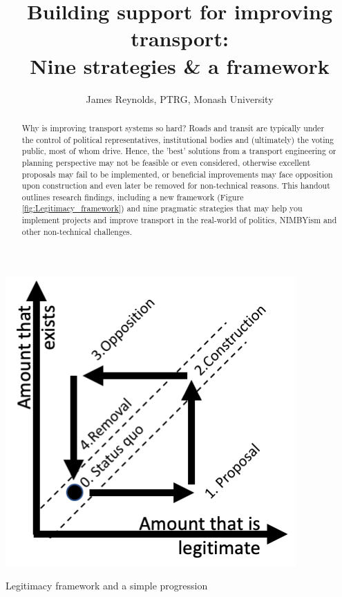 \documentclass{tufte-handout}
\title{Building support for improving transport: \\ Nine strategies \& a framework}
\author{James Reynolds, PTRG, Monash University}
\begin{document}
\maketitle%


\begin{marginfigure}%
  \includegraphics[width=\linewidth]{Framework_and_progression}
  \caption{Legitimacy framework and a simple progression}
  \label{fig:Legitimacy_framework}
\end{marginfigure}
  


\begin{abstract}
\noindent
Why is improving transport systems so hard? Roads and transit are typically under the control of political representatives, institutional bodies and (ultimately) the voting public, most of whom drive. Hence, the 'best' solutions from a transport engineering or planning perspective may not be feasible or even considered, otherwise excellent proposals may fail to be implemented, or beneficial improvements may face opposition upon construction and even later be removed for non-technical reasons. This handout outlines research findings\cite{Reynolds:2020aa}, including a new framework (Figure \ref{fig:Legitimacy_framework}) and nine pragmatic strategies
that may help you implement projects and improve transport in the real-world of politics, NIMBYism and other non-technical challenges.
\end{abstract}
\end{document}
